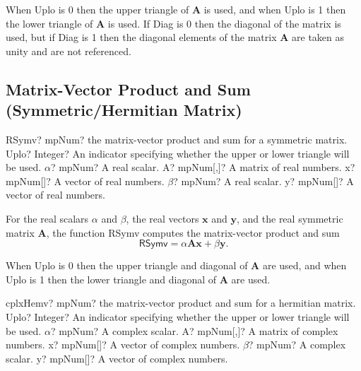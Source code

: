 When \textsf{Uplo} is 0 then the upper triangle of $\boldsymbol{A}$ is used, and when \textsf{Uplo} is 1 then the lower triangle of $\boldsymbol{A}$ is used. If \textsf{Diag} is 0 then the diagonal of the matrix is used, but if \textsf{Diag} is 1 then the diagonal elements of the matrix $\boldsymbol{A}$ are taken as unity and are not referenced. 



\newpage
\subsection{Matrix-Vector Product and Sum (Symmetric/Hermitian Matrix)}

\begin{mpFunctionsExtract}
	\mpFunctionSix
	{RSymv? mpNum? the matrix-vector product and sum for a symmetric matrix.}
	{Uplo? Integer? An indicator specifying whether the upper or lower triangle will be used.}
	{$\alpha$? mpNum? A real scalar.}
	{A? mpNum[,]? A matrix of real numbers.}
	{x? mpNum[]? A vector of real numbers.}
	{$\beta$? mpNum? A real scalar.}
	{y? mpNum[]? A vector of real numbers.}
\end{mpFunctionsExtract}

\vspace{0.3cm}
For the real scalars $\alpha$ and $\beta$, the real vectors $\boldsymbol{x}$ and $\boldsymbol{y}$, and the real symmetric matrix $\boldsymbol{A}$, the function \textsf{RSymv} computes the matrix-vector product and sum 
\begin{equation}
\textsf{RSymv}= \alpha \boldsymbol{A} \boldsymbol{x} + \beta \boldsymbol{y}.
\end{equation}

When \textsf{Uplo} is 0 then the upper triangle and diagonal of $\boldsymbol{A}$ are used, and when \textsf{Uplo} is 1 then the lower triangle and diagonal of $\boldsymbol{A}$ are used. 


\vspace{0.6cm}
\begin{mpFunctionsExtract}
	\mpFunctionSix
	{cplxHemv? mpNum? the matrix-vector product and sum for a hermitian matrix.}
	{Uplo? Integer? An indicator specifying whether the upper or lower triangle will be used.}
	{$\alpha$? mpNum? A complex scalar.}
	{A? mpNum[,]? A matrix of complex numbers.}
	{x? mpNum[]? A vector of complex numbers.}
	{$\beta$? mpNum? A complex scalar.}
	{y? mpNum[]? A vector of complex numbers.}
\end{mpFunctionsExtract}


